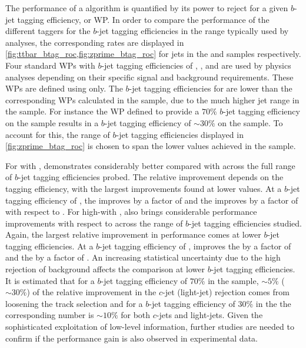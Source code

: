 The performance of a \btag algorithm is quantified by its power to reject \cljets for a given $b$-jet tagging efficiency, or WP. 
In order to compare the \btag performance of the different taggers for the $b$-jet tagging efficiencies in the range typically used by analyses, the corresponding \clrej rates are displayed in \cref{fig:ttbar_btag_roc,fig:zprime_btag_roc} for jets in the \ttbar and \Zprime samples respectively.
Four standard WPs with $b$-jet tagging efficiencies of , ,  and  are used by physics analyses depending on their specific signal and background requirements.
These WPs are defined using \ttbarjets only.
The $b$-jet tagging efficiencies for \Zprimejets are lower than the corresponding WPs calculated in the \ttbar sample, due to the much higher jet \pt range in the \Zprime sample.
For instance the WP defined to provide a $70\%$ $b$-jet tagging efficiency on the \ttbar sample results in a $b$-jet tagging efficiency of $\sim30\%$ on the \Zprime sample.
To account for this, the range of $b$-jet tagging efficiencies displayed in \cref{fig:zprime_btag_roc} is chosen to span the lower values achieved in the \Zprime sample.

For \ttbarjets with \ttbarpt, \GNN demonstrates considerably better \clrej compared with \DLr across the full range of $b$-jet tagging efficiencies probed.
The relative improvement depends on the \bjet tagging efficiency, with the largest improvements found at lower values.
At a $b$-jet tagging efficiency of \pct{\ttlo}, the \crej improves by a factor of \ttbclo and the \lrej improves by a factor of \ttbllo with respect to \DLr.
For high-\pt \Zprimejets with \Zprimept, \GNN also brings considerable performance improvements with respect to \DLr across the range of $b$-jet tagging efficiencies studied.
Again, the largest relative improvement in performance comes at lower $b$-jet tagging efficiencies.
At a $b$-jet tagging efficiency of \pct{\zplo}, \GNN improves the \crej by a factor of \zpbclo and the \lrej by a factor of \zpbllo.
An increasing statistical uncertainty due to the high rejection of background affects the comparison at lower $b$-jet tagging efficiencies.
It is estimated that for a $b$-jet tagging efficiency of $70\%$ in the \ttbar sample, $\sim5\%$ ($\sim30\%$) of the relative improvement in the $c$-jet (light-jet) rejection comes from loosening the track selection and for a $b$-jet tagging efficiency of $30\%$ in the \Zprime the corresponding number is $\sim10\%$ for both $c$-jets and light-jets.
Given the sophisticated exploitation of low-level information, further studies are needed to confirm if the performance gain is also observed in experimental data.

